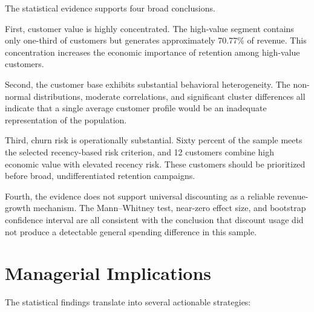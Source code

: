 \documentclass[11pt,a4paper]{article}
\begin{document}
The statistical evidence supports four broad conclusions.

First, customer value is highly concentrated. The high-value segment
contains only one-third of customers but generates approximately 70.77\%
of revenue. This concentration increases the economic importance of
retention among high-value customers.

Second, the customer base exhibits substantial behavioral heterogeneity.
The non-normal distributions, moderate correlations, and significant
cluster differences all indicate that a single average customer profile
would be an inadequate representation of the population.

Third, churn risk is operationally substantial. Sixty percent of the
sample meets the selected recency-based risk criterion, and 12 customers
combine high economic value with elevated recency risk. These customers
should be prioritized before broad, undifferentiated retention campaigns.

Fourth, the evidence does not support universal discounting as a reliable
revenue-growth mechanism. The Mann--Whitney test, near-zero effect size,
and bootstrap confidence interval are all consistent with the conclusion
that discount usage did not produce a detectable general spending
difference in this sample.

\section{Managerial Implications}

The statistical findings translate into several actionable strategies:
\end{document}
